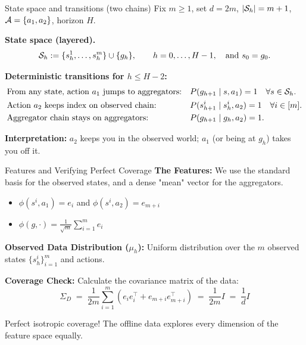 \documentclass[aspectratio=169]{beamer}
\begin{document}
\begin{frame}{State space and transitions (two chains)}
\small
Fix $m\ge 1$, set $d=2m$, $|\mathcal{S}_h|=m+1$, $\mathcal{A}=\{a_1,a_2\}$, horizon $H$.

\vspace{0.5em}
\textbf{State space (layered).}
\[
\mathcal{S}_h := \{s_h^1,\dots,s_h^m\}\cup\{g_h\},\qquad h=0,\dots,H-1,
\quad\text{and } s_0=g_0.
\]

\vspace{0.75em}
\textbf{Deterministic transitions for $h\le H-2$:}
\begin{align*}
&\text{From any state, action $a_1$ jumps to aggregators:}
&&P(g_{h+1}\mid s,a_1)=1 \quad \forall s\in\mathcal{S}_h.\\
&\text{Action $a_2$ keeps index on observed chain:}
&&P(s_{h+1}^i\mid s_h^i,a_2)=1 \quad \forall i\in[m].\\
&\text{Aggregator chain stays on aggregators:}
&&P(g_{h+1}\mid g_h,a_2)=1.
\end{align*}

\vspace{0.5em}
\textbf{Interpretation:} $a_2$ keeps you in the observed world; $a_1$ (or being at $g_h$) takes you off it.
\end{frame}

\begin{frame}{Features and Verifying Perfect Coverage}
    \textbf{The Features:}
    We use the standard basis for the observed states, and a dense "mean" vector for the aggregators.
    \begin{itemize}
        \item $\phi(s^i, a_1) = e_i$ \quad and \quad $\phi(s^i, a_2) = e_{m+i}$
        \item $\phi(g, \cdot) = \frac{1}{\sqrt{m}} \sum_{i=1}^m e_i$
    \end{itemize}

    \vspace{0.3cm}
\pause    \textbf{Observed Data Distribution ($\mu_h$):}
    Uniform distribution over the $m$ observed states $\{s_h^i\}_{i=1}^m$ and actions.
    
    \vspace{0.3cm}
\pause    \textbf{Coverage Check:}
    Calculate the covariance matrix of the data:
    \[
    \Sigma_{D} \;=\; \frac{1}{2m} \sum_{i=1}^m (e_i e_i^\top + e_{m+i} e_{m+i}^\top) \;=\; \frac{1}{2m} I \;=\; \frac{1}{d} I
    \]
    
    \alert{Perfect isotropic coverage!} The offline data explores every dimension of the feature space equally.
\end{frame}
\end{document}
